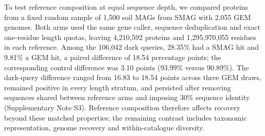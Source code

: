 To test reference composition at equal sequence depth, we compared proteins from a fixed random
sample of 1{,}500 soil MAGs from SMAG \citep{ma2023smag} with 2{,}055 GEM genomes.
Both arms used the same gene caller, sequence deduplication and exact one-residue length quotas,
leaving 4{,}210{,}592 proteins and 1{,}295{,}970{,}055 residues in each reference.
Among the 106{,}042 dark queries, 28.35\% had a SMAG hit and 9.81\% a GEM hit, a paired difference
of 18.54 percentage points; the corresponding control difference was 3.10 points
(93.99\% versus 90.89\%). The dark-query difference ranged from 16.83 to 18.54 points across
three GEM draws, remained positive in every length stratum, and persisted after removing
sequences shared between reference arms and imposing 30\% sequence identity
(Supplementary Note S3). Reference composition therefore affects recovery beyond these matched
properties; the remaining contrast includes taxonomic representation, genome recovery and
within-catalogue diversity.
